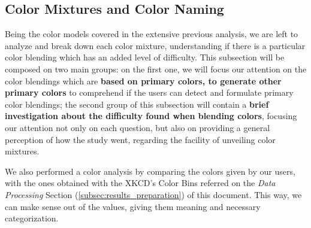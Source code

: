\subsection{Color Mixtures and Color Naming}
\label{subsec:results_colormixtures}
%
Being the color models covered in the extensive previous analysis, we are left to analyze and break down each color mixture, understanding if there is a particular color blending which has an added level of
difficulty.
%
This subsection will be composed on two main groups: on the first one, we will focus our attention on the color blendings which are \textbf{based on primary colors, to generate other primary colors} to comprehend
if the users can detect and formulate primary color blendings; the second group of this subsection will contain a \textbf{brief investigation about the difficulty found when blending colors}, focusing our attention
not only on each question, but also on providing a general perception of how the study went, regarding the facility of unveiling color mixtures. \par
%
We also performed a color analysis by comparing the colors given by our users, with the ones obtained with the XKCD's Color Bins referred on the \emph{Data Processing} Section (\ref{subsec:results_preparation}) of this document. This way,
we can make sense out of the values, giving them meaning and necessary categorization.
%
